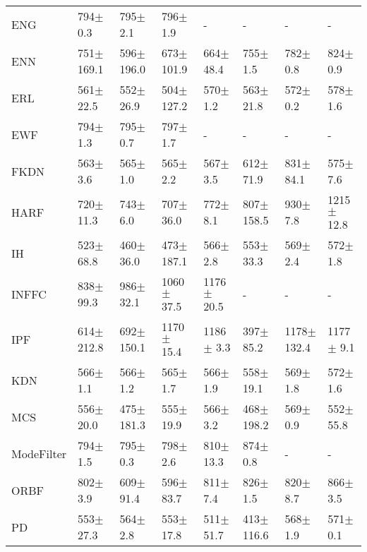 \begin{tabular}{llllllll}
ENG              &    794$\pm$ 0.3 &     795$\pm$ 2.1 &    796$\pm$ 1.9 &               - &                - &                - &                - \\
ENN              &  751$\pm$ 169.1 &   596$\pm$ 196.0 &  673$\pm$ 101.9 &   664$\pm$ 48.4 &     755$\pm$ 1.5 &     782$\pm$ 0.8 &     824$\pm$ 0.9 \\
ERL              &   561$\pm$ 22.5 &    552$\pm$ 26.9 &  504$\pm$ 127.2 &    570$\pm$ 1.2 &    563$\pm$ 21.8 &     572$\pm$ 0.2 &     578$\pm$ 1.6 \\
EWF              &    794$\pm$ 1.3 &     795$\pm$ 0.7 &    797$\pm$ 1.7 &               - &                - &                - &                - \\
FKDN             &    563$\pm$ 3.6 &     565$\pm$ 1.0 &    565$\pm$ 2.2 &    567$\pm$ 3.5 &    612$\pm$ 71.9 &    831$\pm$ 84.1 &     575$\pm$ 7.6 \\
HARF             &   720$\pm$ 11.3 &     743$\pm$ 6.0 &   707$\pm$ 36.0 &    772$\pm$ 8.1 &   807$\pm$ 158.5 &     930$\pm$ 7.8 &   1215$\pm$ 12.8 \\
IH               &   523$\pm$ 68.8 &    460$\pm$ 36.0 &  473$\pm$ 187.1 &    566$\pm$ 2.8 &    553$\pm$ 33.3 &     569$\pm$ 2.4 &     572$\pm$ 1.8 \\
INFFC            &   838$\pm$ 99.3 &    986$\pm$ 32.1 &  1060$\pm$ 37.5 &  1176$\pm$ 20.5 &                - &                - &                - \\
IPF              &  614$\pm$ 212.8 &   692$\pm$ 150.1 &  1170$\pm$ 15.4 &   1186$\pm$ 3.3 &    397$\pm$ 85.2 &  1178$\pm$ 132.4 &    1177$\pm$ 9.1 \\
KDN              &    566$\pm$ 1.1 &     566$\pm$ 1.2 &    565$\pm$ 1.7 &    566$\pm$ 1.9 &    558$\pm$ 19.1 &     569$\pm$ 1.8 &     572$\pm$ 1.6 \\
MCS              &   556$\pm$ 20.0 &   475$\pm$ 181.3 &   555$\pm$ 19.9 &    566$\pm$ 3.2 &   468$\pm$ 198.2 &     569$\pm$ 0.9 &    552$\pm$ 55.8 \\
ModeFilter       &    794$\pm$ 1.5 &     795$\pm$ 0.3 &    798$\pm$ 2.6 &   810$\pm$ 13.3 &     874$\pm$ 0.8 &                - &                - \\
ORBF             &    802$\pm$ 3.9 &    609$\pm$ 91.4 &   596$\pm$ 83.7 &    811$\pm$ 7.4 &     826$\pm$ 1.5 &     820$\pm$ 8.7 &     866$\pm$ 3.5 \\
PD               &   553$\pm$ 27.3 &     564$\pm$ 2.8 &   553$\pm$ 17.8 &   511$\pm$ 51.7 &   413$\pm$ 116.6 &     568$\pm$ 1.9 &     571$\pm$ 0.1 \\

\end{tabular}
